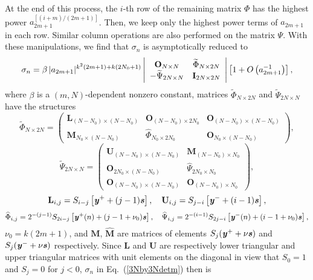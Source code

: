 \documentclass[amsmath,amssymb]{revtex4}
\def\[{\begin{equation}}
\def\]{\end{equation}}
\begin{document}
At the end of this process, the $i$-th row of the remaining matrix $\Phi$ has the highest power $a_{2m+1}^{[(i+m)/(2m+1)]}$. Then, we keep only the highest power terms of $a_{2m+1}$ in each row. Similar column operations are also performed on the matrix $\Psi$. With these manipulations, we find that $\sigma_n$ is asymptotically reduced to
\[ \label{3Nby3Ndetm}
\sigma_{n}=\beta \hspace{0.06cm} |a_{2m+1}|^{k^2(2m+1)+k(2N_0+1)}\left|\begin{array}{cc}
\textbf{O}_{N\times N} & \widetilde{\Phi}_{N\times 2N} \\
-\widetilde{\Psi}_{2N\times N} &  \textbf{I}_{2N \times 2N }
\end{array}\right| \left[1+O\left(a_{2m+1}^{-1}\right)\right],
\]
where $\beta$ is a $(m,N)$-dependent nonzero constant, matrices $\widetilde{\Phi}_{N\times 2N}$ and $\widetilde{\Psi}_{2N\times N}$ have the structures
\[
\widetilde{\Phi}_{N\times 2N}=\left(\begin{array}{ccc} {\textbf{L}}_{(N-N_0)\times (N-N_0)} & \textbf{O}_{(N-N_0)\times 2N_0} & \textbf{O}_{(N-N_0)\times (N-N_0)} \\
{\textbf{M}}_{N_0\times (N-N_0)} & \widehat{\Phi}_{N_0\times 2N_0} & \textbf{O}_{N_0\times (N-N_0)} \end{array}\right),
\]
\[
\widetilde{\Psi}_{2N\times N}=\left(\begin{array}{cc} {\textbf{U}}_{(N-N_0)\times (N-N_0)} & \widehat{{\textbf{M}}}_{(N-N_0)\times N_0} \\
\textbf{O}_{2N_0\times (N-N_0)} & \widehat{\Psi}_{2N_0\times N_0} \\
\textbf{O}_{(N-N_0)\times (N-N_0)} & \textbf{O}_{(N-N_0) \times N_0} \end{array}\right),
\]
\[
{\textbf{L}}_{i,j}=S_{i-j}\left[\textbf{\emph{y}}^{+}+(j-1)\textbf{\emph{s}}\right], \quad
{\textbf{U}}_{i,j}=S_{j-i}\left[\textbf{\emph{y}}^{-}+(i-1)\textbf{\emph{s}}\right],
\]
\begin{eqnarray} \label{widehatPhiPsi}
\widehat{\Phi}_{i,j}=2^{-(j-1)} S_{2i-j}\left[\textbf{\emph{y}}^{+}(n) + (j-1+\nu_0) \textbf{\emph{s}}\right], \quad \widehat{\Psi}_{i,j}=2^{-(i-1)} S_{2j-i}\left[\textbf{\emph{y}}^{-}(n) + (i-1+\nu_0) \textbf{\emph{s}}\right],
\end{eqnarray}
$\nu_0= k(2m+1)$, and ${\textbf{M}}$, $\widehat{{\textbf{M}}}$ are matrices of elements $S_{j}(\textbf{\emph{y}}^{+}+\nu\textbf{\emph{s}})$ and $S_{j}(\textbf{\emph{y}}^{-}+\nu\textbf{\emph{s}})$ respectively. Since ${\textbf{L}}$ and ${\textbf{U}}$ are respectively lower triangular and upper triangular matrices with unit elements on the diagonal in view that $S_0=1$ and $S_j=0$ for $j<0$, $\sigma_n$ in Eq.~(\ref{3Nby3Ndetm}) then is
\end{document}
